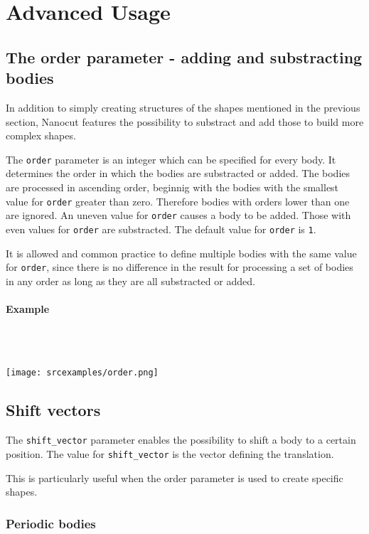\section{Advanced Usage}
\label{Advanced Usage}
\subsection{The order parameter - adding and substracting bodies}
In addition to simply creating structures of the shapes mentioned in the previous section, Nanocut features the possibility to substract and add those to build more complex shapes.

The \lstinline{order} parameter is an integer which can be specified for every body. It determines the order in which the bodies are substracted or added. The bodies are processed in ascending order, beginnig with the bodies with the smallest value for \lstinline{order} greater than zero. Therefore bodies with orders lower than one are ignored.
An uneven value for \lstinline{order} causes a body to be added. Those with even values for \lstinline{order} are substracted. The default value for \lstinline{order} is \lstinline{1}.

It is allowed and common practice to define multiple bodies with the same value for \lstinline{order}, since there is no difference in the result for processing a set of bodies in any order as long as they are all substracted or added.

\paragraph{Example}\ 

\ \\\texttt{[image: srcexamples/order.png]}

\subsection{Shift vectors}
The \lstinline{shift_vector} parameter enables the possibility to shift a body to a certain position. The value for \lstinline{shift_vector} is the vector defining the translation.

This is particularly useful when the order parameter is used to create specific shapes.

\subsubsection{Periodic bodies}

